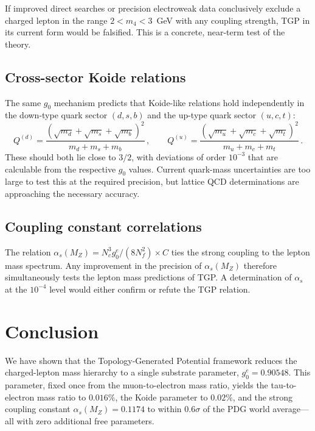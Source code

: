 \documentclass[11pt,a4paper]{article}
\newcommand{\gz}{g_0^e}
\newcommand{\as}{\alpha_s}
\newcommand{\MZ}{M_Z}
\newcommand{\Nc}{N_c}
\newcommand{\Nf}{N_f}
\begin{document}
If improved direct searches or precision electroweak data
conclusively exclude a charged lepton in the range
$2 < m_4 < 3$~GeV with any coupling strength, TGP in its
current form would be falsified.  This is a concrete, near-term
test of the theory.

\subsection{Cross-sector Koide relations}

The same $g_0$ mechanism predicts that Koide-like relations
hold independently in the down-type quark sector $(d,s,b)$ and
the up-type quark sector $(u,c,t)$:
\begin{equation}\label{eq:koide-quarks}
  Q^{(d)} = \frac{(\sqrt{m_d}+\sqrt{m_s}+\sqrt{m_b})^2}
                  {m_d + m_s + m_b}\,,
  \qquad
  Q^{(u)} = \frac{(\sqrt{m_u}+\sqrt{m_c}+\sqrt{m_t})^2}
                  {m_u + m_c + m_t}\,.
\end{equation}
These should both lie close to $3/2$, with deviations of order
$10^{-3}$ that are calculable from the respective $g_0$ values.
Current quark-mass uncertainties are too large to test this at
the required precision, but lattice QCD determinations are
approaching the necessary accuracy.

\subsection{Coupling constant correlations}

The relation $\as(\MZ) = \Nc^3\gz/(8\Nf^2) \times C$ ties
the strong coupling to the lepton mass spectrum.  Any improvement
in the precision of $\as(\MZ)$ therefore simultaneously tests
the lepton mass predictions of TGP.  A determination of $\as$
at the $10^{-4}$ level would either confirm or refute the TGP
relation.

\section{Conclusion}\label{sec:conclusion}

We have shown that the Topology-Generated Potential framework
reduces the charged-lepton mass hierarchy to a single substrate
parameter, $\gz = 0.90548$.  This parameter, fixed once from the
muon-to-electron mass ratio, yields the tau-to-electron mass ratio
to $0.016\%$, the Koide parameter to $0.02\%$, and the strong
coupling constant $\as(\MZ) = 0.1174$ to within $0.6\sigma$ of
the PDG world average---all with zero additional free parameters.
\end{document}
